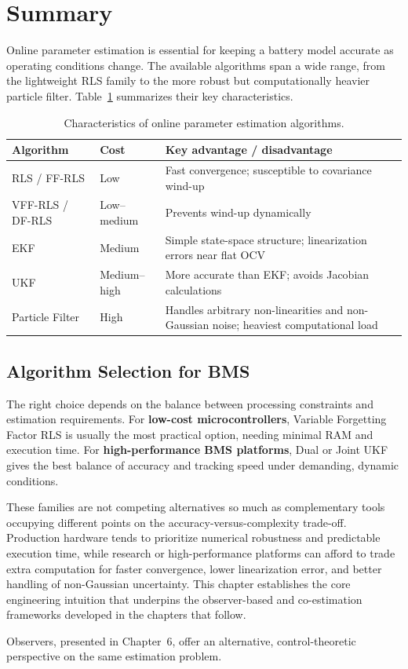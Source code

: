 \section{Summary}
\label{sec:ch5_summary}

Online parameter estimation is essential for keeping a battery model accurate as operating conditions change. The available algorithms span a wide range, from the lightweight RLS family to the more robust but computationally heavier particle filter. Table~\ref{tab:ch5_summary} summarizes their key characteristics.

\begin{table}[htbp]
\centering
\caption{Characteristics of online parameter estimation algorithms.}
\label{tab:ch5_summary}
\footnotesize
\begin{tabularx}{\textwidth}{
    >{\raggedright\arraybackslash}p{2.6cm}
    >{\raggedright\arraybackslash}p{1.6cm}
    >{\raggedright\arraybackslash}X
}
\toprule
\textbf{Algorithm} & \textbf{Cost} & \textbf{Key advantage / disadvantage} \\
\midrule
RLS / FF-RLS & Low & Fast convergence; susceptible to covariance wind-up \\
VFF-RLS / DF-RLS & Low--medium & Prevents wind-up dynamically \\
EKF & Medium & Simple state-space structure; linearization errors near flat OCV \\
UKF & Medium--high & More accurate than EKF; avoids Jacobian calculations \\
Particle Filter & High & Handles arbitrary non-linearities and non-Gaussian noise; heaviest computational load \\
\bottomrule
\end{tabularx}
\end{table}

\subsection{Algorithm Selection for BMS}
\label{subsec:ch5_selection}

The right choice depends on the balance between processing constraints and estimation requirements. For \textbf{low-cost microcontrollers}, Variable Forgetting Factor RLS is usually the most practical option, needing minimal RAM and execution time. For \textbf{high-performance BMS platforms}, Dual or Joint UKF gives the best balance of accuracy and tracking speed under demanding, dynamic conditions.

These families are not competing alternatives so much as complementary tools occupying different points on the accuracy-versus-complexity trade-off. Production hardware tends to prioritize numerical robustness and predictable execution time, while research or high-performance platforms can afford to trade extra computation for faster convergence, lower linearization error, and better handling of non-Gaussian uncertainty. This chapter establishes the core engineering intuition that underpins the observer-based and co-estimation frameworks developed in the chapters that follow.

Observers, presented in Chapter~6, offer an alternative, control-theoretic perspective on the same estimation problem.